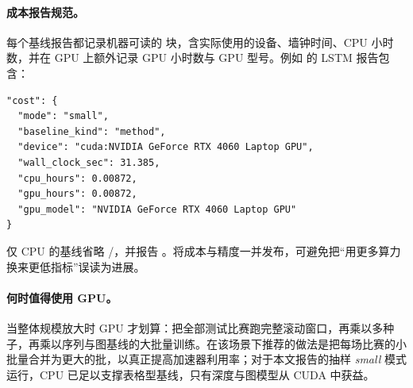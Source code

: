 \paragraph{成本报告规范。}每个基线报告都记录机器可读的  块，含实际使用的设备、墙钟时间、CPU 小时数，并在 GPU 上额外记录 GPU 小时数与 GPU 型号。例如  的 LSTM 报告包含：
\begin{verbatim}
"cost": {
  "mode": "small",
  "baseline_kind": "method",
  "device": "cuda:NVIDIA GeForce RTX 4060 Laptop GPU",
  "wall_clock_sec": 31.385,
  "cpu_hours": 0.00872,
  "gpu_hours": 0.00872,
  "gpu_model": "NVIDIA GeForce RTX 4060 Laptop GPU"
}
\end{verbatim}
仅 CPU 的基线省略 /，并报告 。将成本与精度一并发布，可避免把“用更多算力换来更低指标”误读为进展。

\paragraph{何时值得使用 GPU。}当整体规模放大时 GPU 才划算：把全部测试比赛跑完整滚动窗口，再乘以多种子，再乘以序列与图基线的大批量训练。在该场景下推荐的做法是把每场比赛的小批量合并为更大的批，以真正提高加速器利用率；对于本文报告的抽样 \emph{small} 模式运行，CPU 已足以支撑表格型基线，只有深度与图模型从 CUDA 中获益。
